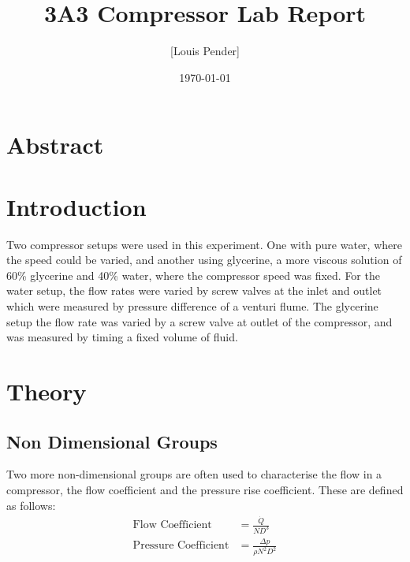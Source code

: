 \documentclass{article}
\title{3A3 Compressor Lab Report}
\author{[Louis Pender]}
\date{\today}
\begin{document}
\maketitle

\section{Abstract}

\section{Introduction}

Two compressor setups were used in this experiment.
One with pure water, where the speed could be varied, and another using glycerine, a more viscous solution of 60\%
glycerine and 40\% water, where the compressor speed was fixed.
For the water setup, the flow rates were varied by screw valves at the inlet and outlet which were measured by pressure difference of a venturi flume.
The glycerine setup the flow rate was varied by a screw valve at outlet of the compressor, and was measured by timing a fixed volume of fluid.

\section{Theory}





\subsection{Non Dimensional Groups}


Two more non-dimensional groups are often used to characterise the flow in a compressor, the flow coefficient and the pressure rise coefficient.
These are defined as follows:
\begin{align}
    \text{Flow Coefficient} &= \frac{\dot{Q}}{ND^3} \label{eq:flow_coeff}\\
    \text{Pressure Coefficient} &= \frac{\Delta p}{\rho N^2 D^2} \label{eq:pressure_coeff}
\end{align}
\end{document}
